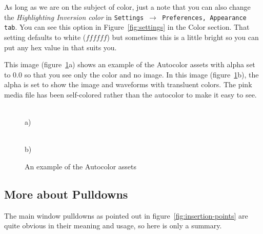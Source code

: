 As long as we are on the subject of color, just a note that you can also change the \textit{Highlighting Inversion color} in \texttt{Settings $\rightarrow$ Preferences, Appearance tab}.  You can see this option in Figure~\ref{fig:settings} in the Color section.  
That setting defaults to white ($ffffff$) but sometimes this is a little bright so you can put any hex value in that suits you.

This image (figure~\ref{fig:autocolor_assets_alpha}a) shows an example of the Autocolor assets with alpha set to 0.0 so that you see only the color and no image.
In this image (figure~\ref{fig:autocolor_assets_alpha}b), the alpha is set to show the image
and waveforms with transluent colors.  The pink media file has been self-colored rather than the autocolor to make it easy to see.

\begin{figure}[htpb]
    \centering
    \begin{minipage}[h]{0.55\linewidth}
         \\ a)
    \end{minipage}
    \begin{minipage}[h]{0.4\linewidth}
         \\ b)
    \end{minipage}
    \caption{An example of the Autocolor assets}
    \label{fig:autocolor_assets_alpha}
\end{figure}


\subsection{More about Pulldowns}%
\label{sub:more_about_pulldowns}

The main window pulldowns as pointed out in figure~\ref{fig:insertion-points} are quite obvious in their meaning and usage, so here is only a summary.  



